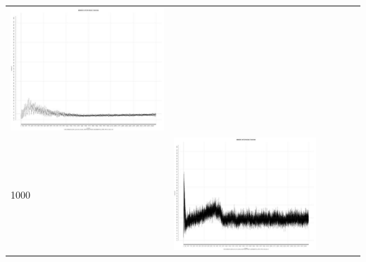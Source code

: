 \begin{table}[htbp]
{\begin{tabular}{l | ccccc}
\begin{minipage}{.15\textwidth}
     			 	\includegraphics[width=\linewidth]{images/mema-triple/I10}
    				 \end{minipage}\\	
		1000   &	 \begin{minipage}{.15\textwidth}\vspace{2pt}     							
     			 	\includegraphics[width=\linewidth]{images/mema-triple/I4}
    				 \end{minipage}
    			   &	 \begin{minipage}{.15\textwidth}\vspace{2pt}     							

\end{minipage}
\end{tabular}}
\end{table}
